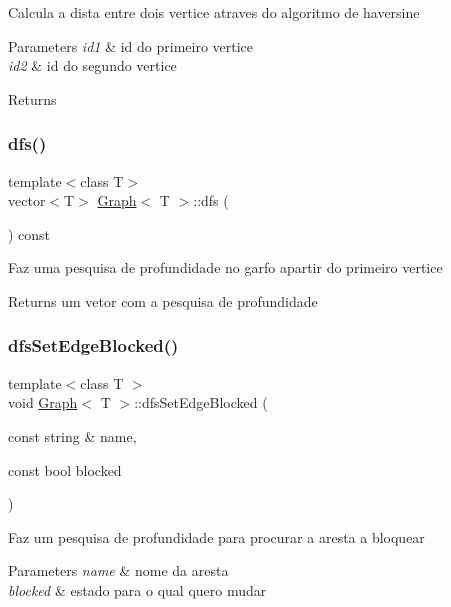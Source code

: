 Calcula a dista entre dois vertice atraves do algoritmo de haversine 
\begin{DoxyParams}{Parameters}
{\em id1} & id do primeiro vertice \\
\hline
{\em id2} & id do segundo vertice \\
\hline
\end{DoxyParams}
\begin{DoxyReturn}{Returns}

\end{DoxyReturn}
\mbox{\label{class_graph_ae71a01383d3232c98ed1216fc52f2474}} 
\subsubsection{\texorpdfstring{dfs()}{dfs()}}
{\footnotesize\ttfamily template$<$class T$>$ \\
vector$<$T$>$ \mbox{\hyperlink{class_graph}{Graph}}$<$ T $>$\+::dfs (\begin{DoxyParamCaption}{ }\end{DoxyParamCaption}) const}

Faz uma pesquisa de profundidade no garfo apartir do primeiro vertice \begin{DoxyReturn}{Returns}
um vetor com a pesquisa de profundidade 
\end{DoxyReturn}
\mbox{\label{class_graph_a99f1bd2b6751af18c9f4fe998b1276a3}} 
\subsubsection{\texorpdfstring{dfs\+Set\+Edge\+Blocked()}{dfsSetEdgeBlocked()}}
{\footnotesize\ttfamily template$<$class T $>$ \\
void \mbox{\hyperlink{class_graph}{Graph}}$<$ T $>$\+::dfs\+Set\+Edge\+Blocked (\begin{DoxyParamCaption}\item[{const string \&}]{name,  }\item[{const bool}]{blocked }\end{DoxyParamCaption})}

Faz um pesquisa de profundidade para procurar a aresta a bloquear 
\begin{DoxyParams}{Parameters}
{\em name} & nome da aresta \\
\hline
{\em blocked} & estado para o qual quero mudar \\
\hline
\end{DoxyParams}
\mbox{\label{class_graph_ab2bb8011642e0d5e6a71e0981d661056}} 
